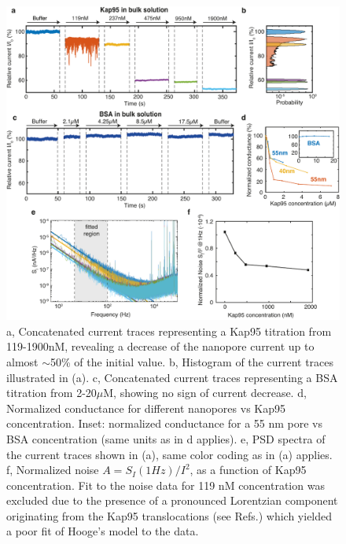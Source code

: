 \begin{figure}[!htbp]
	\centering
	\includegraphics[width=1\linewidth]{figures/Figure7.1.2.pdf}
	\caption{a, Concatenated current traces representing a Kap95 titration from 119-1900nM, revealing a decrease of the nanopore current up to almost $\sim$50\% of the initial value. b, Histogram of the current traces illustrated in (a). c, Concatenated current traces representing a BSA titration from 2-20$\mu$M, showing no sign of current decrease. d, Normalized conductance for different nanopores vs Kap95 concentration. Inset: normalized conductance for a 55 nm pore vs BSA concentration (same units as in d applies). e, PSD spectra of the current traces shown in (a), same color coding as in (a) applies. f, Normalized noise $A=S_I (1Hz)/I^2$, as a function of Kap95 concentration. Fit to the noise data for 119 nM concentration was excluded due to the presence of a pronounced Lorentzian component originating from the Kap95 translocations (see Refs.\cite{Fragasso2020,Machlup1954}) which yielded a poor fit of Hooge’s model to the data.}
	\label{fig:fig7.1.2}
\end{figure}


